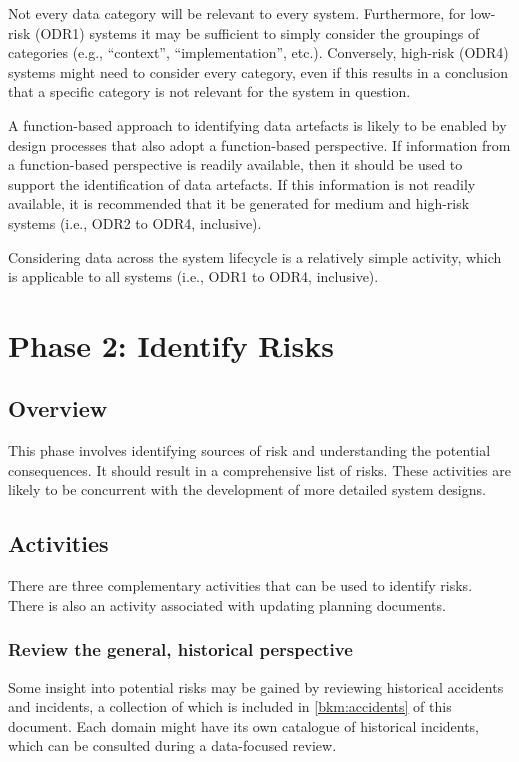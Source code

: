 Not every data category will be relevant to every system. Furthermore, for low-risk (ODR1) systems it may be sufficient to simply consider the groupings of categories (e.g., ``context'', ``implementation'', etc.). Conversely, high-risk (ODR4) systems might need to consider every category, even if this results in a conclusion that a specific category is not relevant for the system in question.

A function-based approach to identifying \glspl{data artefact} is likely to be enabled by design processes that also adopt a function-based perspective. If \gls{information} from a function-based perspective is readily available, then it should be used to support the identification of \glspl{data artefact}. If this \gls{information} is not readily available, it is recommended that it be generated for medium and high-risk systems (i.e., ODR2 to ODR4, inclusive).

Considering data across the system lifecycle is a relatively simple activity, which is applicable to all systems (i.e., ODR1 to ODR4, inclusive).

\clearpage
\section{Phase 2: Identify Risks}
\subsection{Overview}
This phase involves identifying sources of risk and understanding the potential consequences. It should result in a comprehensive list of risks. These activities are likely to be concurrent with the development of more detailed system designs.

\subsection{Activities}
There are three complementary activities that can be used to identify risks. There is also an activity associated with updating planning documents.

\subsubsection{Review the general, historical perspective}
Some insight into potential risks may be gained by reviewing historical accidents and incidents, a collection of which is included in
\autoref{bkm:accidents} of this document. Each domain might have its own catalogue of historical incidents, which can be consulted during a data-focused review.

